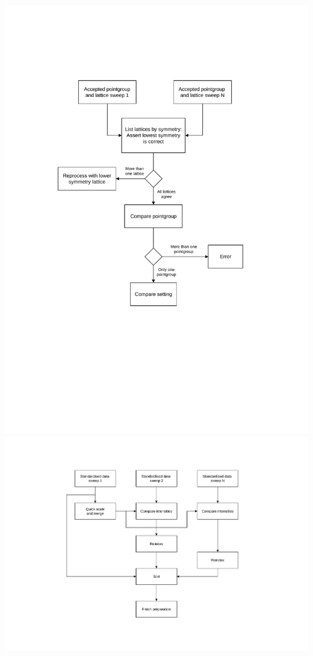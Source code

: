 \documentclass[a4paper, 11pt]{article}
\begin{document}
\includegraphics[scale=0.5]{figures/scaling-step-2.pdf}
\includegraphics[scale=0.5]{figures/scaling-step-3.pdf}
\end{document}
